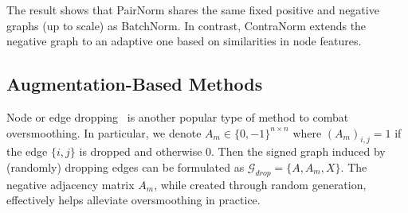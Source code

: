 The result shows that PairNorm shares the same fixed positive and negative graphs (up to scale) as BatchNorm. In contrast, ContraNorm extends the negative graph to an adaptive one based on similarities in node features. 







\subsection{Augmentation-Based Methods}
Node or edge dropping~\citep{dropedge} is another popular type of method to combat oversmoothing.
In particular, we denote $A_m\in \{0,-1\}^{n\times n}$ where $(A_m)_{i,j}=1$ if the edge $\{i,j\}$ is dropped and otherwise 0. 
Then the signed graph induced by (randomly) dropping edges can be formulated as \(\mathcal{G}_{drop}=\{A,A_m,X\}\). 
The negative adjacency matrix $A_m$, while created through random generation, effectively helps alleviate oversmoothing in practice.




